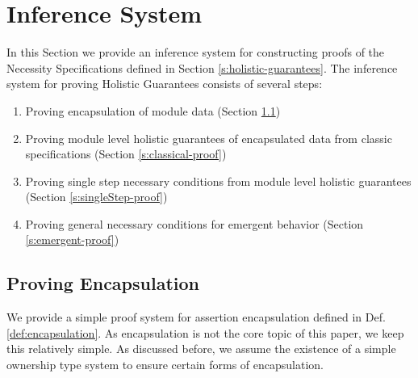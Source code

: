 \section{Inference System}  
\label{s:inference}

In this Section we provide an inference system for constructing 
proofs of the Necessity Specifications defined in Section \ref{s:holistic-guarantees}.
The inference system for proving Holistic Guarantees consists of several steps:
\begin{enumerate}
\item
Proving encapsulation of module data (Section \ref{s:encap-proof})
\item
Proving module level holistic guarantees of encapsulated data from classic specifications (Section \ref{s:classical-proof})
\item
Proving single step necessary conditions from module level holistic guarantees (Section \ref{s:singleStep-proof})
\item
Proving general necessary conditions for emergent behavior (Section \ref{s:emergent-proof})
\end{enumerate}

\subsection{Proving Encapsulation}
\label{s:encap-proof}

We provide a simple proof system for assertion encapsulation defined in Def. \ref{def:encapsulation}. As encapsulation is not the core topic of this paper, we keep this
relatively simple. As discussed before, we assume the existence of a simple ownership type system to ensure certain forms of encapsulation.

